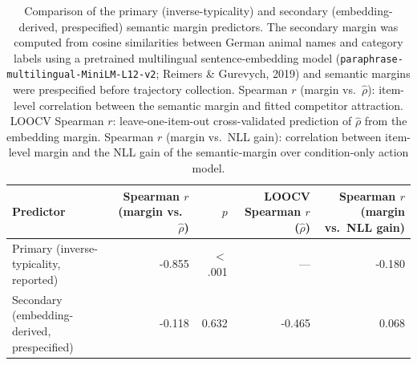 \begin{table}[htbp]
\centering
\caption{Comparison of the primary (inverse-typicality) and secondary (embedding-derived, prespecified) semantic margin predictors. The secondary margin was computed from cosine similarities between German animal names and category labels using a pretrained multilingual sentence-embedding model (\texttt{paraphrase-multilingual-MiniLM-L12-v2}; Reimers \& Gurevych, 2019) and semantic margins were prespecified before trajectory collection. Spearman $r$ (margin vs.\ $\hat{\rho}$): item-level correlation between the semantic margin and fitted competitor attraction. LOOCV Spearman $r$: leave-one-item-out cross-validated prediction of $\hat{\rho}$ from the embedding margin. Spearman $r$ (margin vs.\ NLL gain): correlation between item-level margin and the NLL gain of the semantic-margin over condition-only action model.}
\label{tab:embedding-semantic-validation}
\small
\begin{tabular}{p{4.5cm}rrrr}
\toprule
Predictor & Spearman $r$ (margin vs.\ $\hat{\rho}$) & $p$ & LOOCV Spearman $r$ ($\hat{\rho}$) & Spearman $r$ (margin vs.\ NLL gain) \\
\midrule
Primary (inverse-typicality, reported) & -0.855 & $<$.001 & --- & -0.180 \\
Secondary (embedding-derived, prespecified) & -0.118 & 0.632 & -0.465 & 0.068 \\
\bottomrule
\end{tabular}
\end{table}